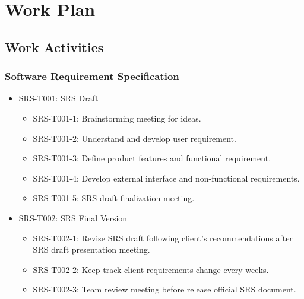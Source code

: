 \documentclass[11pt, a4paper]{article}
\begin{document}
	
	\section{Work Plan}
	
	\subsection{Work Activities}
		\subsubsection{Software Requirement Specification}
		\begin{itemize}
			\item SRS-T001: SRS Draft
			\begin{itemize}
				\item SRS-T001-1: Brainstorming meeting for ideas.
				\item SRS-T001-2: Understand and develop user requirement.
				\item SRS-T001-3: Define product features and functional requirement.
				\item SRS-T001-4: Develop external interface and non-functional requirements.
				\item SRS-T001-5: SRS draft finalization meeting.
			\end{itemize}
			\item SRS-T002: SRS Final Version
			\begin{itemize}
				\item  SRS-T002-1: Revise SRS draft following client's recommendations after SRS draft presentation meeting.
				\item  SRS-T002-2: Keep track client requirements change every weeks.
				\item  SRS-T002-3: Team review meeting before release official SRS document.
			\end{itemize}
		\end{itemize}
	
\end{document}

